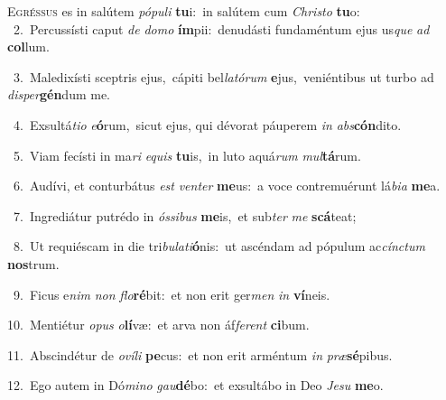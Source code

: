 \lettrine{\initial\textcolor{\initialcolor}{E}}{gréssus} es in salútem \textit{pó}\-\textit{pu}\textit{li} \textbf{tu}\-i:~\star in salútem cum \textit{Chris}\-\textit{to} \textbf{tu}\-o:\\
{\numbfont\textcolor{\numbcolor}{~2.}}~Percussísti caput \textit{de} \textit{do}\-\textit{mo} \textbf{ím}\-pii:~\star denudásti fundaméntum ejus us\textit{que} \textit{ad} \textbf{col}\-lum.\par
{\numbfont\textcolor{\numbcolor}{~3.}}~Maledixísti sceptris ejus,~\dagger cápiti bel\-\textit{la}\-\textit{tó}\textit{rum} \textbf{e}\-jus,~\star veniéntibus ut turbo ad \textit{di}\-\textit{sper}\textbf{gén}dum me.\par
{\numbfont\textcolor{\numbcolor}{~4.}}~Exsultá\-\textit{ti}\-\textit{o} \textit{e}\-\textbf{ó}rum,~\star sicut ejus, qui dévorat páuperem \textit{in} \textit{abs}\-\textbf{cón}dito.\par
{\numbfont\textcolor{\numbcolor}{~5.}}~Viam fecísti in ma\textit{ri} \textit{e}\-\textit{quis} \textbf{tu}\-is,~\star in luto aquá\textit{rum} \textit{mul}\-\textbf{tá}rum.\par
{\numbfont\textcolor{\numbcolor}{~6.}}~Audívi, et conturbátus \textit{est} \textit{ven}\-\textit{ter} \textbf{me}\-us:~\star a voce contremuérunt lá\-\textit{bi}\-\textit{a} \textbf{me}\-a.\par
{\numbfont\textcolor{\numbcolor}{~7.}}~Ingrediátur putrédo in \textit{ós}\-\textit{si}\textit{bus} \textbf{me}\-is,~\star et sub\textit{ter} \textit{me} \textbf{scá}\-teat;\par
{\numbfont\textcolor{\numbcolor}{~8.}}~Ut requiéscam in die tri\-\textit{bu}\-\textit{la}\textit{ti}\textbf{ó}nis:~\star ut ascéndam ad pópulum ac\-\textit{cínc}\-\textit{tum} \textbf{nos}\-trum.\par
{\numbfont\textcolor{\numbcolor}{~9.}}~Ficus e\textit{nim} \textit{non} \textit{flo}\-\textbf{ré}bit:~\star et non erit ger\textit{men} \textit{in} \textbf{ví}\-neis.\par
{\numbfont\textcolor{\numbcolor}{10.}}~Mentiétur \textit{o}\-\textit{pus} \textit{o}\-\textbf{lí}væ:~\star et arva non áf\-\textit{fe}\-\textit{rent} \textbf{ci}\-bum.\par
{\numbfont\textcolor{\numbcolor}{11.}}~Abscindétur de \textit{o}\-\textit{ví}\textit{li} \textbf{pe}\-cus:~\star et non erit arméntum \textit{in} \textit{præ}\-\textbf{sé}pibus.\par
{\numbfont\textcolor{\numbcolor}{12.}}~Ego autem in Dó\-\textit{mi}\-\textit{no} \textit{gau}\-\textbf{dé}bo:~\star et exsultábo in Deo \textit{Je}\-\textit{su} \textbf{me}\-o.\par
